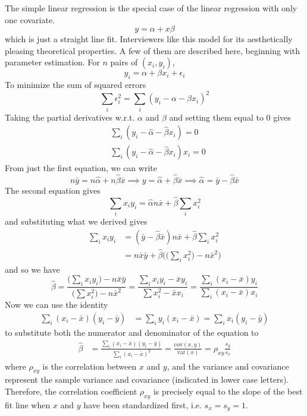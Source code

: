 \documentclass{article}
\theoremstyle{definition}
\theoremstyle{remark}
\theoremstyle{definition}
\begin{document}
The simple linear regression is the special case of the linear regression with only one covariate. 
\[y = \alpha + x \beta\]
which is just a straight line fit. Interviewers like this model for its aesthetically pleasing theoretical properties. A few of them are described here, beginning with parameter estimation. For $n$ pairs of $(x_i, y_i)$, 
\[y_i = \alpha + \beta x_i + \epsilon_i\]
To minimize the sum of squared errors 
\[\sum_{i} \epsilon_i^2 = \sum_{i} (y_i - \alpha - \beta x_i)^2\]
Taking the partial derivatives w.r.t. $\alpha$ and $\beta$ and setting them equal to $0$ gives 
\begin{align*}
    &\sum_i (y_i - \hat{\alpha} - \hat{\beta} x_i) = 0 \\
    &\sum_i (y_i - \hat{\alpha} - \hat{\beta} x_i) x_i = 0
\end{align*}
From just the first equation, we can write 
\[n \bar{y} = n \hat{\alpha} + n \hat{\beta} \bar{x} \implies y = \hat{\alpha} + \hat{\beta} \bar{x} \implies \hat{\alpha}  = \bar{y} - \hat{\beta} \bar{x} \]
The second equation gives 
\[\sum_{i} x_i y_i = \hat{\alpha} n \bar{x} + \hat{\beta} \sum_{i} x_i^2\]
and substituting what we derived gives 
\begin{align*}
    \sum_{i} x_i y_i & = (\bar{y} - \hat{\beta} \bar{x}) n \bar{x} + \hat{\beta} \sum_i x_i^2 \\
    & = n \bar{x} \bar{y} + \hat{\beta} \bigg( \Big(\sum_i x_i^2 \Big) - n \bar{x}^2 \bigg)
\end{align*}
and so we have 
\[\hat{\beta} = \frac{ \big( \sum_i x_i y_i \big) - n \bar{x}\bar{y}}{\big( \sum x_i^2 \big) - n \bar{x}^2} = \frac{ \sum_i x_i y_i - \bar{x} y_i}{\sum x_i^2 - \bar{x} x_i} = \frac{ \sum_i (x_i - \bar{x}) y_i}{\sum_i (x_i - \bar{x}) x_i}\]
Now we can use the identity
\begin{align*}
    \sum_{i} (x_i - \bar{x}) (y_i - \bar{y}) & = \sum_i y_i (x_i - \bar{x}) = \sum_i x_i (y_i - \bar{y}) 
\end{align*}
to substitute both the numerator and denominator of the equation to 
\begin{align*}
    \hat{\beta} & = \frac{\sum_i (x_i - \bar{x}) (y_i - \bar{y})}{\sum_i (x_i - \bar{x})^2} = \frac{\mathrm{cov}(x, y)}{\mathrm{var}(x)} = \rho_{xy} \frac{s_y}{s_x}
\end{align*}
where $\rho_{xy}$ is the correlation between $x$ and $y$, and the variance and covariance represent the sample variance and covariance (indicated in lower case letters). Therefore, the correlation coefficient $\rho_{xy}$ is precisely equal to the slope of the best fit line when $x$ and $y$ have been standardized first, i.e. $s_x = s_y = 1$. 
\end{document}
